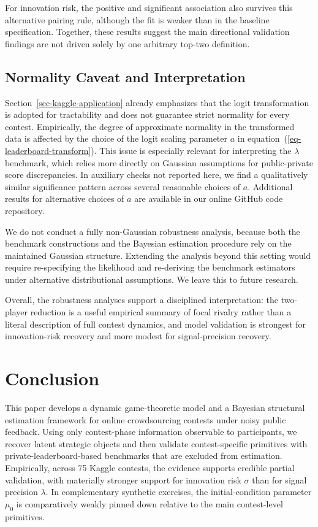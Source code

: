 \documentclass[mnsc]{informs3}
\begin{document}
For innovation risk, the positive and significant association also survives this alternative pairing rule, although the fit is weaker than in the baseline specification.
Together, these results suggest the main directional validation findings are not driven solely by one arbitrary top-two definition.


\subsection{Normality Caveat and Interpretation}\label{sect-robust-normality}

Section~\ref{sec-kaggle-application} already emphasizes that the logit transformation is adopted for tractability and does not guarantee strict normality for every contest.
Empirically, the degree of approximate normality in the transformed data is affected by the choice of the logit scaling parameter $a$ in equation~(\ref{eq-leaderboard-transform}).
This issue is especially relevant for interpreting the $\lambda$ benchmark, which relies more directly on Gaussian assumptions for public-private score discrepancies.
In auxiliary checks not reported here, we find a qualitatively similar significance pattern across several reasonable choices of $a$.
Additional results for alternative choices of $a$ are available in our online GitHub code repository.

We do not conduct a fully non-Gaussian robustness analysis, because both the benchmark constructions and the Bayesian estimation procedure rely on the maintained Gaussian structure.
Extending the analysis beyond this setting would require re-specifying the likelihood and re-deriving the benchmark estimators under alternative distributional assumptions.
We leave this to future research.

Overall, the robustness analyses support a disciplined interpretation: the two-player reduction is a useful empirical summary of focal rivalry rather than a literal description of full contest dynamics, and model validation is strongest for innovation-risk recovery and more modest for signal-precision recovery.


\section{Conclusion}

This paper develops a dynamic game-theoretic model and a Bayesian structural estimation framework for online crowdsourcing contests under noisy public feedback.
Using only contest-phase information observable to participants, we recover latent strategic objects and then validate contest-specific primitives with private-leaderboard-based benchmarks that are excluded from estimation.
Empirically, across 75 Kaggle contests, the evidence supports credible partial validation, with materially stronger support for innovation risk $\sigma$ than for signal precision $\lambda$.
In complementary synthetic exercises, the initial-condition parameter $\mu_0$ is comparatively weakly pinned down relative to the main contest-level primitives.
\end{document}

